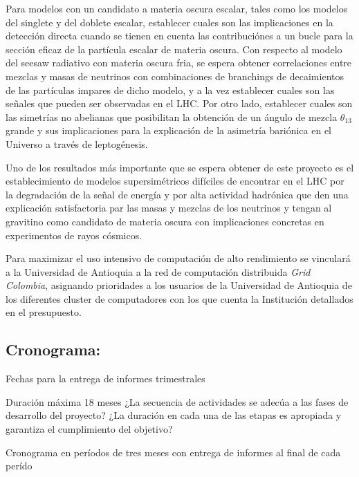 \begin{darkmatter}
  Para modelos con un candidato a materia oscura escalar, tales como
  los modelos del singlete y del doblete escalar, establecer cuales son las
  implicaciones en la detección directa cuando se tienen en cuenta las
  contribuciónes a un bucle  para la sección eficaz de la
  partícula escalar de materia oscura. Con respecto al modelo del
  seesaw radiativo con materia oscura fria, se espera obtener correlaciones entre mezclas y masas de
  neutrinos con combinaciones de branchings de decaimientos de las
  partículas impares de dicho modelo, y a la vez establecer cuales son
  las señales que pueden ser observadas en el LHC. Por otro lado,
  establecer cuales son las simetrías no abelianas que posibilitan
  la obtención de un ángulo de mezcla $\theta_{13}$ grande y sus
  implicaciones para la explicación de la asimetría bariónica en el
  Universo a través de leptogénesis.
\end{darkmatter}

Uno de los resultados más importante que se espera obtener de este
proyecto es el establecimiento de modelos supersimétricos difíciles de
encontrar en el LHC por la degradación de la señal de energía y por
alta actividad hadrónica que den una explicación satisfactoria par las
masas y mezclas de los  neutrinos y tengan al gravitino como candidato
de materia oscura con implicaciones concretas en experimentos de rayos
cósmicos.  

Para maximizar el uso intensivo de computación de alto rendimiento
se vinculará a la Universidad de Antioquia a la red de computación
distribuida \emph{Grid Colombia}, asignando prioridades a los usuarios
de la Universidad de Antioquia de los diferentes cluster de
computadores con los que cuenta la Institución detallados en el
presupuesto. 

\subsection{Cronograma:                                    }
\begin{evaluacion}
  Fechas para la entrega de informes trimestrales
\end{evaluacion}

\begin{instrucciones}
Duración máxima 18 meses
  ¿La secuencia de actividades se adecúa a las fases de desarrollo del proyecto? ¿La duración en cada una de las etapas es apropiada y garantiza el cumplimiento del objetivo?
\end{instrucciones}
Cronograma en períodos de tres meses con entrega de informes al final
de cada perído

